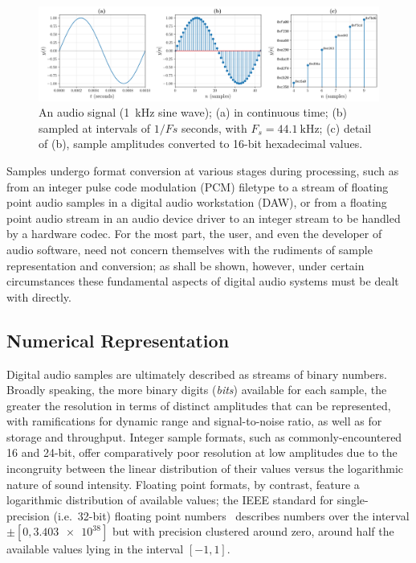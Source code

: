\begin{figure}[ht]
    \centering
    \includegraphics[width=\textwidth]{figures/digital-signal}
    \caption{
        An audio signal (\qty{1}{\kHz} sine wave);
        (a) in continuous time;
        (b) sampled at intervals of $1/Fs$ seconds, with $F_s=\qty{44.1}{\kHz}$;
        (c) detail of (b), sample amplitudes converted to 16-bit hexadecimal
        values.
    }
    \label{fig:signal-samples}
\end{figure}

Samples undergo format conversion at various stages during processing, such as
from an integer pulse code modulation (PCM) filetype to a stream of floating
point audio samples in a digital audio workstation (DAW), or from a floating
point audio stream in an audio device driver to an integer stream to be handled
by a hardware codec.
For the most part, the user, and even the developer of audio software, need not
concern themselves with the rudiments of sample representation and conversion;
as shall be shown, however, under certain circumstances these fundamental
aspects of digital audio systems must be dealt with directly.

\subsection{Numerical Representation}\label{subsec:numerical-representation}

Digital audio samples are ultimately described as streams of binary numbers.
Broadly speaking, the more binary digits (\textit{bits}) available for each
sample, the greater the resolution in terms of distinct amplitudes that can be
represented, with ramifications for dynamic range and signal-to-noise ratio, as
well as for storage and throughput.
Integer sample formats, such as commonly-encountered 16 and 24-bit, offer
comparatively poor resolution at low amplitudes due to the incongruity between
the linear distribution of their values versus the logarithmic nature of sound
intensity.
Floating point formats, by contrast, feature a logarithmic distribution of
available values; the IEEE standard for single-precision (i.e.\ 32-bit) floating
point numbers~\citep{ieee_ieee_1985} describes numbers over the interval
$\pm[0,\num{3.403e38}]$ but with precision clustered around zero, around half
the available values lying in the interval $[-1, 1]$.

